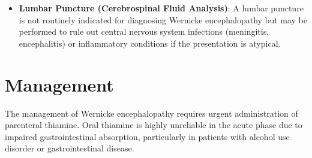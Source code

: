 \begin{itemize}
\begin{itemize}
        \item \textbf{Computed Tomography (CT) Scan}: A head CT is generally insensitive for Wernicke encephalopathy and is primarily used to exclude other acute intracranial pathologies, such as hemorrhage, mass lesions, or large strokes.
    \end{itemize}
    \item \textbf{Lumbar Puncture (Cerebrospinal Fluid Analysis)}: A lumbar puncture is not routinely indicated for diagnosing Wernicke encephalopathy but may be performed to rule out central nervous system infections (meningitis, encephalitis) or inflammatory conditions if the presentation is atypical.
\end{itemize}

\section*{Management}
The management of Wernicke encephalopathy requires urgent administration of parenteral thiamine. Oral thiamine is highly unreliable in the acute phase due to impaired gastrointestinal absorption, particularly in patients with alcohol use disorder or gastrointestinal disease.

